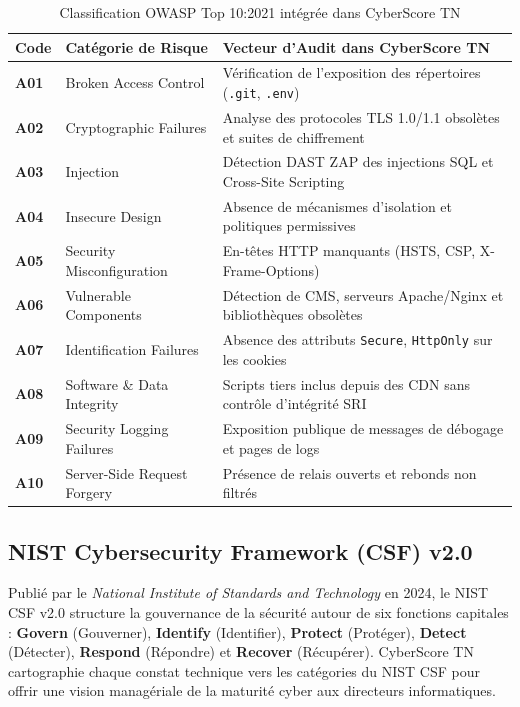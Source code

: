 \begin{table}[!htbp]
\centering
\caption{Classification OWASP Top 10:2021 intégrée dans CyberScore TN}
\label{tab:owasp}
\begin{singlespace}
\footnotesize
\renewcommand{\arraystretch}{1.08}
\begin{tabularx}{\textwidth}{l p{5cm} X}
\toprule
\textbf{Code} & \textbf{Catégorie de Risque} & \textbf{Vecteur d'Audit dans CyberScore TN} \\
\midrule
\textbf{A01} & Broken Access Control & Vérification de l'exposition des répertoires (\texttt{.git}, \texttt{.env}) \\
\textbf{A02} & Cryptographic Failures & Analyse des protocoles TLS 1.0/1.1 obsolètes et suites de chiffrement \\
\textbf{A03} & Injection & Détection DAST ZAP des injections SQL et Cross-Site Scripting \\
\textbf{A04} & Insecure Design & Absence de mécanismes d'isolation et politiques permissives \\
\textbf{A05} & Security Misconfiguration & En-têtes HTTP manquants (HSTS, CSP, X-Frame-Options) \\
\textbf{A06} & Vulnerable Components & Détection de CMS, serveurs Apache/Nginx et bibliothèques obsolètes \\
\textbf{A07} & Identification Failures & Absence des attributs \texttt{Secure}, \texttt{HttpOnly} sur les cookies \\
\textbf{A08} & Software \& Data Integrity & Scripts tiers inclus depuis des CDN sans contrôle d'intégrité SRI \\
\textbf{A09} & Security Logging Failures & Exposition publique de messages de débogage et pages de logs \\
\textbf{A10} & Server-Side Request Forgery & Présence de relais ouverts et rebonds non filtrés \\
\bottomrule
\end{tabularx}
\end{singlespace}
\end{table}

\subsection{NIST Cybersecurity Framework (CSF) v2.0}
Publié par le \textit{National Institute of Standards and Technology} en 2024, le NIST CSF v2.0 \cite{nistcsfv2} structure la gouvernance de la sécurité autour de six fonctions capitales : \textbf{Govern} (Gouverner), \textbf{Identify} (Identifier), \textbf{Protect} (Protéger), \textbf{Detect} (Détecter), \textbf{Respond} (Répondre) et \textbf{Recover} (Récupérer). CyberScore TN cartographie chaque constat technique vers les catégories du NIST CSF pour offrir une vision managériale de la maturité cyber aux directeurs informatiques.

